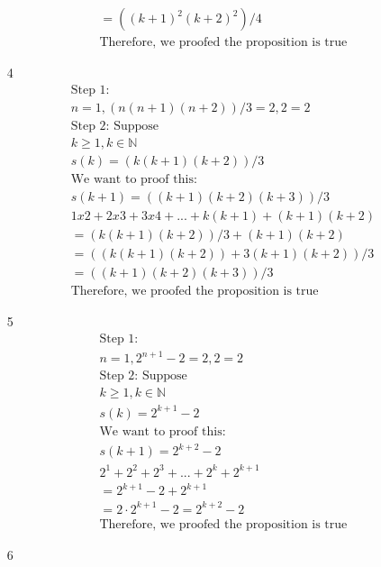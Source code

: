 \documentclass[12pt]{article}
\begin{document}
\begin{enumerate}
\begin{equation*}
\begin{split}
		    = ((k+1)^2 (k+2)^2)/4\\
		    \text{Therefore, we proofed the proposition is true}
	    	\end{split}
	    \end{equation*}
	\item [4] 
	    \begin{equation*}
	    	\begin{split}
		    \text{Step 1:}\\
		    n = 1, (n(n+1)(n+2))/3 = 2, 2 = 2\\
		    \text{Step 2: Suppose}\\
		    k \ge 1, k \in \mathbb{N}\\
		    s(k) = (k(k+1)(k+2))/3\\
		    \text{We want to proof this:}\\
		    s(k+1) = ((k+1)(k+2)(k+3))/3\\
		    1x2 + 2x3 + 3x4 + ... + k(k+1) + (k+1)(k+2)\\
		    = (k(k+1)(k+2))/3 + (k+1)(k+2)\\
		    = ((k(k+1)(k+2)) + 3(k+1)(k+2))/3\\
		    = ((k+1)(k+2)(k+3))/3\\
		    \text{Therefore, we proofed the proposition is true}
	    	\end{split}
	    \end{equation*}
	\item [5] 
	    \begin{equation*}
	    	\begin{split}
		    \text{Step 1:}\\
		    n = 1, 2^{n+1} -2 = 2, 2=2\\
		    \text{Step 2: Suppose}\\
		    k \ge 1, k \in \mathbb{N}\\
		    s(k) = 2^{k+1} -2\\
		    \text{We want to proof this:}\\
		    s(k+1) = 2^{k+2} -2\\
		    2^1 + 2^2 + 2^3 + ... + 2^k + 2^{k+1}\\
		    = 2^{k+1}-2 + 2^{k+ 1}\\
		    = 2\cdot 2^{k+1} -2 = 2^{k+2} -2\\
		    \text{Therefore, we proofed the proposition is true}
	    	\end{split}
	    \end{equation*}
	\item [6] 
	    \begin{equation*}

\end{equation*}
\end{enumerate}
\end{document}
